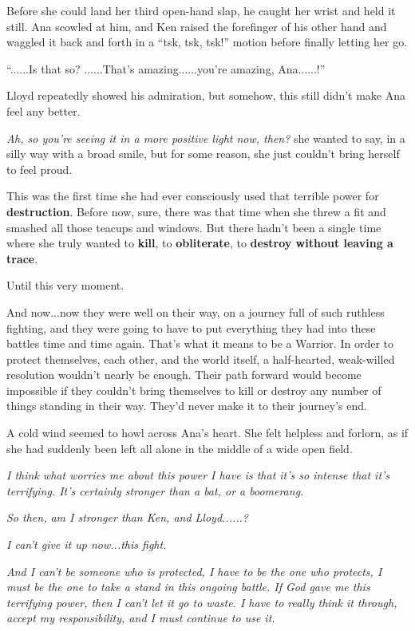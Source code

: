 \documentclass[
]{article}
\begin{document}
Before she could land her third open-hand slap, he caught her wrist and
held it still. Ana scowled at him, and Ken raised the forefinger of his
other hand and waggled it back and forth in a ``tsk, tsk, tsk!'' motion
before finally letting her go.

``......Is that so? ......That's amazing......you're amazing,
Ana......!''

Lloyd repeatedly showed his admiration, but somehow, this still didn't
make Ana feel any better.

\emph{Ah, so you're seeing it in a more positive light now, then?} she
wanted to say, in a silly way with a broad smile, but for some reason,
she just couldn't bring herself to feel proud.

This was the first time she had ever consciously used that terrible
power for \textbf{destruction}. Before now, sure, there was that time
when she threw a fit and smashed all those teacups and windows. But
there hadn't been a single time where she truly wanted to \textbf{kill},
to \textbf{obliterate}, to \textbf{destroy without leaving a trace}.

Until this very moment.

And now...now they were well on their way, on a journey full of such
ruthless fighting, and they were going to have to put everything they
had into these battles time and time again. That's what it means to be a
Warrior. In order to protect themselves, each other, and the world
itself, a half-hearted, weak-willed resolution wouldn't nearly be
enough. Their path forward would become impossible if they couldn't
bring themselves to kill or destroy any number of things standing in
their way. They'd never make it to their journey's end.

A cold wind seemed to howl across Ana's heart. She felt helpless and
forlorn, as if she had suddenly been left all alone in the middle of a
wide open field.

\emph{I think what worries me about this power I have is that it's so
intense that it's terrifying. It's certainly stronger than a bat, or a
boomerang.}

\emph{So then, am I stronger than Ken, and Lloyd......?}

\emph{I can't give it up now...this fight.}

\emph{And I can't be someone who is protected, I have to be the one who
protects, I must be the one to take a stand in this ongoing battle. If
God gave me this terrifying power, then I can't let it go to waste. I
have to really think it through, accept my responsibility, and I must
continue to use it.}
\end{document}
